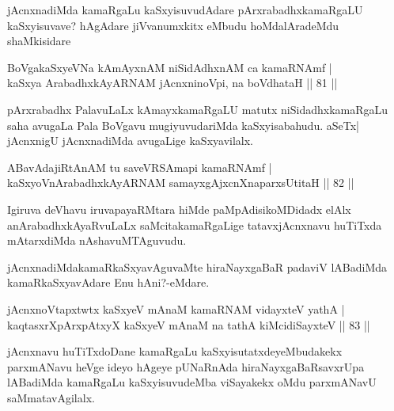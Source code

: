 \begin{artha}
jAcnxnadiMda kamaRgaLu kaSxyisuvudAdare pArxrabadhxkamaRgaLU kaSxyisuvave? hAgAdare jiVvanumxkitx eMbudu hoMdalAradeMdu shaMkisidare
\end{artha}


\begin{shl}
BoVgakaSxyeVNa kAmAyxnAM niSidAdhxnAM ca kamaRNAmf |\\
kaSxya ArabadhxkAyARNAM jAcnxninoV\s pi, na boVdhataH \hfill || 81 ||
\end{shl}

\begin{artha}
pArxrabadhx PalavuLaLx kAmayxkamaRgaLU matutx niSidadhxkamaRgaLu saha avugaLa Pala BoVgavu mugiyuvudariMda kaSxyisabahudu. aSeTx| jAcnxnigU jAcnxnadiMda avugaLige kaSxyavilalx.
\end{artha}

\begin{shl}
ABavAdajiRtAnAM tu saveVRSAmapi kamaRNAmf |\\
kaSxyoV\s nArabadhxkAyARNAM samayxgAjxcnXnaparxsUtitaH \hfill || 82 ||
\end{shl}

\begin{artha}
Igiruva deVhavu iruvapayaRMtara hiMde paMpAdisikoMDidadx elAlx  anArabadhxkAyaRvuLaLx saMcitakamaRgaLige tatavxjAcnxnavu huTiTxda mAtarxdiMda nAshavuMTAguvudu.
\end{artha}

\begin{artha}
jAcnxnadiMdakamaRkaSxyavAguvaMte hiraNayxgaBaR padaviV lABadiMda kamaRkaSxyavAdare Enu hAni?-eMdare.
\end{artha}


\begin{shl}
jAcnxnoVtapxtwtx kaSxyeV mAnaM kamaRNAM vidayxteV yathA |\\
kaqtasxrXpArxpAtxyX kaSxyeV mAnaM na tathA kiMcidiSayxteV \hfill || 83 ||
\end{shl}

\begin{artha}
jAcnxnavu huTiTxdoDane kamaRgaLu kaSxyisutatxdeyeMbudakekx parxmANavu heVge ideyo hAgeye pUNaRnAda hiraNayxgaBaRsavxrUpa lABadiMda kamaRgaLu kaSxyisuvudeMba viSayakekx oMdu parxmANavU saMmatavAgilalx.
\end{artha}


